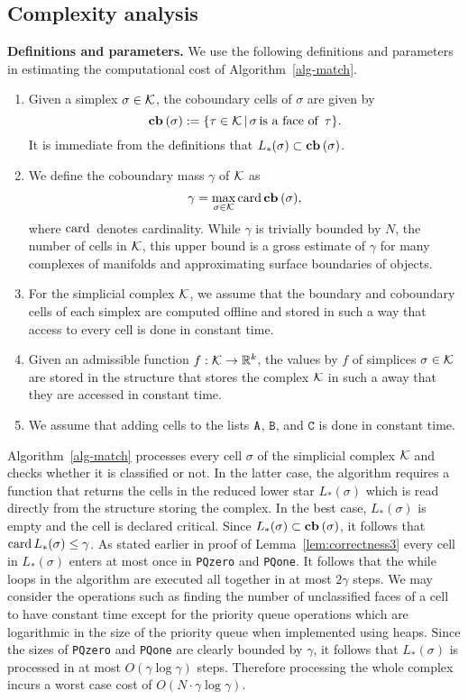 \documentclass[12pt]{article}
\newcommand{\R}{{\mathbb R}}
\newcommand{\cK}{{\cal K}}
\newcommand{\sB}{\texttt{B}}
\newcommand{\sC}{\texttt{C}} \newcommand{\sD}{\texttt{D}} \newcommand{\sM}{\texttt{M}} \newcommand{\sL}{\texttt{L}}
\begin{document}
\subsection{Complexity analysis}
\label{sec:complexity}

{\bf Definitions and parameters.} We use the following definitions and parameters in estimating the computational cost of Algorithm~\ref{alg-match}.
\begin{enumerate}
 \item Given a simplex $\sigma \in \cK$, the coboundary cells of $\sigma$ are given by
$$\cb (\sigma) := \{ \tau \in \cK \, |\, \sigma \, \mbox{is a face of } \,  \tau\}.$$
It is immediate from the definitions that $L_* (\sigma) \subset \mbox{\rm \bf cb\,} (\sigma)$.

\item We define the coboundary mass $\gamma$ of $\cK$ as
$$\gamma = \max_{\sigma \in \cK} \card \cb(\sigma),$$
where $\mbox{\rm card\,}$ denotes cardinality. While $\gamma$ is trivially bounded by $N$, the number of cells in $\cK$,
this upper bound is a gross estimate of $\gamma$ for many complexes of manifolds and approximating surface boundaries of objects.

\item For the simplicial complex $\cK$, we assume that the boundary and coboundary cells of each simplex
are computed offline and stored in such a way that access to every cell is done in constant time.

\item Given an admissible function $f : {\cK} \to \R^k$, the values by $f$ of simplices $\sigma \in \cK$ are stored in the structure
that stores the complex $\cK$ in such a away that they are accessed in constant time.

\item We assume that adding cells to the lists $\texttt{A}$, $\sB$, and $\sC$ is done in constant time.
\end{enumerate}


Algorithm~\ref{alg-match} processes every cell $\sigma$ of the simplicial complex $\cK$ and checks whether it is classified or not.
In the latter case, the algorithm requires a function that returns the cells in the reduced lower star $L_* (\sigma)$ which
is read directly from the structure storing the complex. In the best case, $L_* (\sigma)$ is empty and the cell is declared critical.
Since $L_* (\sigma) \subset \mbox{\rm \bf cb\,} (\sigma)$, it follows that $\mbox{\rm card\,} L_* (\sigma) \leq \gamma$.
As stated earlier in proof of Lemma~\ref{lem:correctness3} every cell in $L_* (\sigma)$ enters at most once in \texttt{PQzero} and \texttt{PQone}.
It follows that the while loops in the algorithm are executed all together in at most $2 \gamma$ steps. We may consider the operations such as finding
the number of unclassified faces of a cell to have constant time except for the priority queue operations which are logarithmic in the size of the priority queue
when implemented using heaps. Since the sizes of \texttt{PQzero} and \texttt{PQone} are clearly bounded by $\gamma$, it follows that $L_* (\sigma)$ is
processed in at most $O(\gamma \log \gamma)$ steps.
Therefore processing the whole complex incurs a worst case cost of $O(N \cdot \gamma \log \gamma)$.
\end{document}
